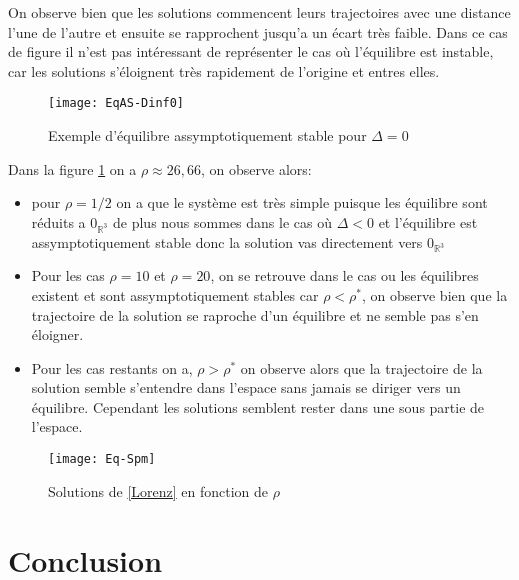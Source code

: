 \documentclass{article}
\newcommand{\R}{\mathbb{R}}
\newtheorem[M , nocut]{prop}{Proposition}[section]
\newtheorem[S , nocut]{definition}{Définition}
\newtheorem[S , nocut]{lemme}{Lemme}
\newtheorem[L , nocut]{thm}{Théoreme}
\newtheorem[L , nocut]{cor}{Corollaire}
\begin{document}
\begin{example}
    On observe bien que les solutions commencent leurs trajectoires avec une distance l'une de l'autre et ensuite se rapprochent jusqu'a un écart très faible. Dans ce cas de figure il n'est pas intéressant de représenter le cas où l'équilibre est instable, car les solutions s'éloignent très rapidement de l'origine et entres elles.
    
    \begin{figure}[ht]
        \centering
        \texttt{[image: EqAS-Dinf0]}
        \caption{Exemple d'équilibre assymptotiquement stable pour $\Delta=0$}
    \end{figure}
\end{example}
\begin{example}[Exemple]
    Dans la figure \ref{fig:Eq-Spm} on a $\rho \approx 26,66$, on observe alors:
    \begin{itemize}
        \item pour $\rho = 1/2$ on a que le système est très simple puisque les équilibre sont réduits a $0_{\R^3}$ de plus nous sommes dans le cas où $\Delta < 0$ et l'équilibre est assymptotiquement stable donc la solution vas directement vers $0_{\R^3}$
        \item  Pour les cas $\rho = 10$ et $\rho =20$, on se retrouve dans le cas ou les équilibres existent et sont assymptotiquement stables car $\rho<\rho^*$, on observe bien que la trajectoire de la solution se raproche d'un équilibre et ne semble pas s'en éloigner.
        \item Pour les cas restants on a, $\rho>\rho^*$ on observe alors que la trajectoire de la solution semble s'entendre dans l'espace sans jamais se diriger vers un équilibre. Cependant les solutions semblent rester dans une sous partie de l'espace.
    \end{itemize}
    \begin{figure}[ht]
        \texttt{[image: Eq-Spm]}
        \label{fig:Eq-Spm}
        \caption{Solutions de \eqref{Lorenz} en fonction de $\rho$}
    \end{figure}
\end{example}
\newpage
\section{Conclusion}
\end{document}
